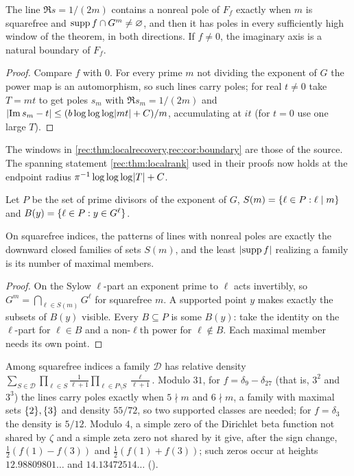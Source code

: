 \begin{corollary}\label{rec:cor:boundary}
The line $\Re s=1/(2m)$ contains a nonreal pole of $F_f$ exactly when $m$ is squarefree and
$\operatorname{supp} f\cap G^m\ne\varnothing$, and then it has poles in every sufficiently high window of the
theorem, in both directions. If $f\ne0$, the imaginary axis is a natural boundary of $F_f$.
\end{corollary}

\begin{proof}
Compare $f$ with $0$. For every prime $m$ not dividing the exponent of $G$ the power map is an
automorphism, so such lines carry poles; for real $t\ne0$ take $T=mt$ to get poles $s_m$ with
$\Re s_m=1/(2m)$ and $\lvert\operatorname{Im} s_m-t\rvert\le(b\log\log\log\lvert mt\rvert+C)/m$, accumulating at $it$ (for $t=0$ use one
large $T$).
\end{proof}

The windows in \cref{rec:thm:localrecovery,rec:cor:boundary} are those of the source. The spanning
statement \cref{rec:thm:localrank} used in their proofs now holds at the endpoint radius
$\pi^{-1}\log\log\log\lvert T\rvert+C$.

Let $P$ be the set of prime divisors of the exponent of $G$, $S(m)=\{\ell\in P:\ell\mid m\}$ and
$B(y)=\{\ell\in P:y\in G^\ell\}$.

\begin{theorem}\label{rec:thm:design}
On squarefree indices, the patterns of lines with nonreal poles are exactly the downward closed
families of sets $S(m)$, and the least $\lvert\operatorname{supp} f\rvert$ realizing a family is its number of maximal
members.
\end{theorem}

\begin{proof}
On the Sylow $\ell$-part an exponent prime to $\ell$ acts invertibly, so $G^m=\bigcap_{\ell\in S(m)}G^\ell$
for squarefree $m$. A supported point $y$ makes exactly the subsets of $B(y)$ visible. Every
$B\subseteq P$ is some $B(y)$: take the identity on the $\ell$-part for $\ell\in B$ and a non-$\ell$th
power for $\ell\notin B$. Each maximal member needs its own point.
\end{proof}

Among squarefree indices a family $\mathcal D$ has relative density
$\sum_{S\in\mathcal D}\prod_{\ell\in S}\frac1{\ell+1}\prod_{\ell\in P\setminus S}\frac\ell{\ell+1}$. Modulo
$31$, for $f=\delta_9-\delta_{27}$ (that is, $3^2$ and $3^3$) the lines carry poles exactly when
$5\nmid m$ and $6\nmid m$, a family with maximal sets $\{2\},\{3\}$ and density $55/72$, so two
supported classes are needed; for $f=\delta_3$ the density is $5/12$. Modulo $4$, a simple zero of
the Dirichlet beta function not shared by $\zeta$ and a simple zeta zero not shared by it give, after
the sign change, $\tfrac12(f(1)-f(3))$ and $\tfrac12(f(1)+f(3))$; such zeros occur at heights
$12.98809801\ldots$ and $14.13472514\ldots$ ().

